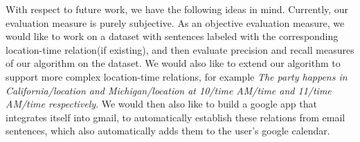\documentclass[runningheads,a4paper,11pt]{llncs}
\begin{document}
With respect to future work, we have the following ideas in mind. Currently, our evaluation measure is purely
subjective. As an objective evaluation measure, we would like to work on a dataset with sentences labeled with the corresponding location-time relation(if existing), and then 
 evaluate precision and recall measures of our algorithm on the dataset. We would also like to extend our algorithm to support more complex location-time 
 relations, for example \textit{The party happens in California/location and Michigan/location at 10/time AM/time and 11/time AM/time respectively}. We would then also like to build a google app that integrates itself into gmail, to automatically establish these relations
 from email sentences, which also automatically adds them to the user's google calendar.


 


 
 
\end{document}
